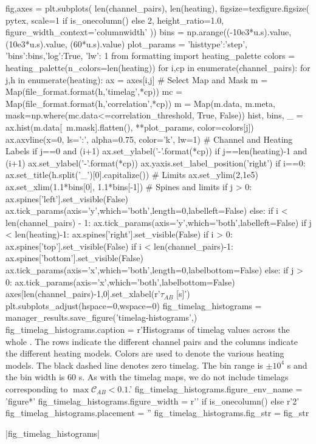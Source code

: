 \begin{pycode}
fig,axes = plt.subplots(
    len(channel_pairs), len(heating),
    figsize=texfigure.figsize(
        pytex,
        scale=1 if is_onecolumn() else 2,
        height_ratio=1.0,
        figure_width_context='columnwidth'
))
bins = np.arange((-10e3*u.s).value, (10e3*u.s).value, (60*u.s).value)
plot_params = {'histtype':'step', 'bins':bins,'log':True,
                'lw': 1}
from formatting import heating_palette
colors = heating_palette(n_colors=len(heating))
for i,cp in enumerate(channel_pairs):
    for j,h in enumerate(heating):
        ax = axes[i,j]
        # Select Map and Mask
        m = Map(file_format.format(h,'timelag',*cp))
        mc = Map(file_format.format(h,'correlation',*cp))
        m = Map(m.data, m.meta, mask=np.where(mc.data<=correlation_threshold, True, False))
        hist, bins, _ = ax.hist(m.data[~m.mask].flatten(), **plot_params, color=colors[j])
        ax.axvline(x=0, ls=':', alpha=0.75, color='k', lw=1)
        # Channel and Heating Labels
        if j==0 and (i+1)%
            ax.set_ylabel('{}-{}'.format(*cp))
        if j==len(heating)-1 and (i+1)%
            ax.set_ylabel('{}-{}'.format(*cp))
            ax.yaxis.set_label_position('right')
        if i==0:
            ax.set_title(h.split('_')[0].capitalize())
        # Limits
        ax.set_ylim(2,1e5)
        ax.set_xlim(1.1*bins[0], 1.1*bins[-1])
        # Spines and limits
        if j > 0:
            ax.spines['left'].set_visible(False)
            ax.tick_params(axis='y',which='both',length=0,labelleft=False)
        else:
            if i < len(channel_pairs) - 1:
                ax.tick_params(axis='y',which='both',labelleft=False)
        if j < len(heating)-1:
            ax.spines['right'].set_visible(False)
        if i > 0:
            ax.spines['top'].set_visible(False)
        if i < len(channel_pairs)-1:
            ax.spines['bottom'].set_visible(False)
            ax.tick_params(axis='x',which='both',length=0,labelbottom=False)
        else:
            if j > 0:
                ax.tick_params(axis='x',which='both',labelbottom=False)
axes[len(channel_pairs)-1,0].set_xlabel(r'$\tau_{AB}$ [s]')
plt.subplots_adjust(hspace=0,wspace=0)
fig_timelag_histograms = manager_results.save_figure('timelag-histograms',)
fig_timelag_histograms.caption = r'Histograms of timelag values across the whole \AR{}. The rows indicate the different channel pairs and the columns indicate the different heating models. Colors are used to denote the various heating models. The black dashed line denotes zero timelag. The bin range is $\pm10^4$ s and the bin width is 60 s. As with the timelag maps, we do not include timelags corresponding to $\max{\mathcal{C}_{AB}}<0.1$.'
fig_timelag_histograms.figure_env_name = 'figure*'
fig_timelag_histograms.figure_width = r'\columnwidth' if is_onecolumn() else r'2\columnwidth'
fig_timelag_histograms.placement = ''
fig_timelag_histograms.fig_str = fig_str
\end{pycode}
|fig_timelag_histograms|

